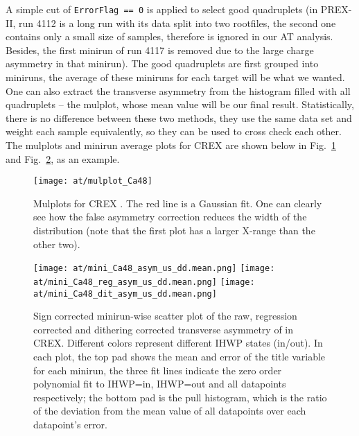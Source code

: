 A simple cut of \verb|ErrorFlag == 0| is applied to select good quadruplets 
(in PREX-II, run 4112 is a long run with its data split into two rootfiles, the
second one contains only a small size of samples, therefore is ignored in our AT analysis.
Besides, the first minirun of run 4117 is removed due to the large charge asymmetry
in that minirun). The good quadruplets are first grouped into miniruns, 
the average of these miniruns for each target will be what we wanted. 
One can also extract the transverse asymmetry from the histogram filled with
all quadruplets -- the mulplot, whose mean value will be our final result. 
Statistically, there is no difference between these two methods,
they use the same data set and weight each sample equivalently, so they can
be used to cross check each other. The mulplots and minirun average plots for
CREX \Ca are shown below in Fig.~\ref{fig:AT_crex_Ca48_mulplot} and 
Fig.~\ref{fig:AT_crex_Ca48_miniruns}, as an example.

\begin{figure}[!h]
    \centering
    \texttt{[image: at/mulplot\_Ca48]}
    \caption[AT \Ca Mulplots]
    {Mulplots for CREX \Ca. The red line is a Gaussian fit. One can clearly 
    see how the false asymmetry correction reduces the width of the distribution (note that
    the first plot has a larger X-range than the other two).}
    \label{fig:AT_crex_Ca48_mulplot}
\end{figure}

\begin{figure}[H]
    \centering
    \texttt{[image: at/mini\_Ca48\_asym\_us\_dd.mean.png]}
    \texttt{[image: at/mini\_Ca48\_reg\_asym\_us\_dd.mean.png]}
    \texttt{[image: at/mini\_Ca48\_dit\_asym\_us\_dd.mean.png]}
    \caption[AT \Ca asymmetry plot]
    {Sign corrected minirun-wise scatter plot of the raw, regression corrected and 
    dithering corrected transverse asymmetry of \Ca in CREX. Different colors represent
    different IHWP states (in/out). In each plot, the top pad shows the 
    mean and error of the title variable for each minirun, the three fit lines indicate
    the zero order polynomial fit to IHWP=in, IHWP=out and all datapoints respectively;
    the bottom pad is the pull histogram, which is the ratio of the deviation 
    from the mean value of all datapoints over each datapoint's error.
    }
    \label{fig:AT_crex_Ca48_miniruns}
\end{figure}


